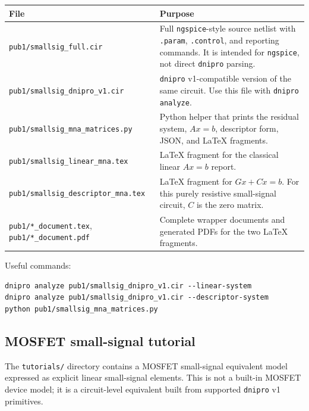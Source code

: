 \documentclass[11pt,a4paper]{article}
\newcommand{\project}{\texttt{dnipro}}
\newcommand{\code}[1]{\texttt{#1}}
\newcommand{\ngspice}{\texttt{ngspice}}
\begin{document}
\begin{longtable}{p{}p{}}
\toprule
File & Purpose \\
\midrule
\code{pub1/smallsig\_full.cir} &
    Full \ngspice{}-style source netlist with \code{.param}, \code{.control},
    and reporting commands. It is intended for \ngspice{}, not direct
    \project{} parsing. \\
\code{pub1/smallsig\_dnipro\_v1.cir} &
    \project{} v1-compatible version of the same circuit. Use this file with
    \code{dnipro analyze}. \\
\code{pub1/smallsig\_mna\_matrices.py} &
    Python helper that prints the residual system, \(A x = b\), descriptor
    form, JSON, and \LaTeX{} fragments. \\
\code{pub1/smallsig\_linear\_mna.tex} &
    \LaTeX{} fragment for the classical linear \(A x = b\) report. \\
\code{pub1/smallsig\_descriptor\_mna.tex} &
    \LaTeX{} fragment for \(Gx + C\dot{x} = b\). For this purely resistive
    small-signal circuit, \(C\) is the zero matrix. \\
\code{pub1/*\_document.tex}, \code{pub1/*\_document.pdf} &
    Complete wrapper documents and generated PDFs for the two \LaTeX{}
    fragments. \\
\bottomrule
\end{longtable}

Useful commands:

\begin{lstlisting}[style=shell]
dnipro analyze pub1/smallsig_dnipro_v1.cir --linear-system
dnipro analyze pub1/smallsig_dnipro_v1.cir --descriptor-system
python pub1/smallsig_mna_matrices.py
\end{lstlisting}

\subsection{MOSFET small-signal tutorial}

The \code{tutorials/} directory contains a MOSFET small-signal equivalent model
expressed as explicit linear small-signal elements. This is not a built-in
MOSFET device model; it is a circuit-level equivalent built from supported
\project{} v1 primitives.
\end{document}
